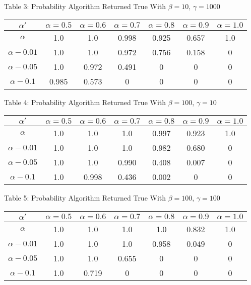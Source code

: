 \documentclass{article}
\begin{document}
\begin{center}
Table 3: Probability Algorithm Returned True With $\beta=10$, $\gamma=1000$ \\
\begin{tabular}{|c|c|c|c|c|c|c|}
\hline
$\alpha'$ & $\alpha = 0.5$ & $\alpha = 0.6$ & $\alpha = 0.7$ & $\alpha = 0.8$ & $\alpha = 0.9$ & $\alpha = 1.0$ \\
\hline
$\alpha$ & 1.0 & 1.0 & 0.998 & 0.925 & 0.657 & 1.0 \\
\hline
$\alpha-0.01$ & 1.0 & 1.0 & 0.972 & 0.756 & 0.158 & 0 \\
\hline
$\alpha-0.05$ & 1.0 & 0.972 & 0.491 & 0 & 0 & 0 \\
\hline
$\alpha-0.1$ & 0.985 & 0.573 & 0 & 0 & 0 & 0 \\
\hline
\end{tabular}
\end{center}

\begin{center}
Table 4: Probability Algorithm Returned True With $\beta=100$, $\gamma=10$ \\
\begin{tabular}{|c|c|c|c|c|c|c|}
\hline
$\alpha'$ & $\alpha = 0.5$ & $\alpha = 0.6$ & $\alpha = 0.7$ & $\alpha = 0.8$ & $\alpha = 0.9$ & $\alpha = 1.0$ \\
\hline
$\alpha$ & 1.0 & 1.0 & 1.0 & 0.997 & 0.923 & 1.0 \\
\hline
$\alpha-0.01$ & 1.0 & 1.0 & 1.0 & 0.982 & 0.680 & 0 \\
\hline
$\alpha-0.05$ & 1.0 & 1.0 & 0.990 & 0.408 & 0.007 & 0 \\
\hline
$\alpha-0.1$ & 1.0 & 0.998 & 0.436 & 0.002 & 0 & 0 \\
\hline
\end{tabular}
\end{center}

\begin{center}
Table 5: Probability Algorithm Returned True With $\beta=100$, $\gamma=100$ \\
\begin{tabular}{|c|c|c|c|c|c|c|}
\hline
$\alpha'$ & $\alpha = 0.5$ & $\alpha = 0.6$ & $\alpha = 0.7$ & $\alpha = 0.8$ & $\alpha = 0.9$ & $\alpha = 1.0$ \\
\hline
$\alpha$ & 1.0 & 1.0 & 1.0 & 1.0 & 0.832 & 1.0 \\
\hline
$\alpha-0.01$ & 1.0 & 1.0 & 1.0 & 0.958 & 0.049 & 0 \\
\hline
$\alpha-0.05$ & 1.0 & 1.0 & 0.655 & 0 & 0 & 0 \\
\hline
$\alpha-0.1$ & 1.0 & 0.719 & 0 & 0 & 0 & 0 \\
\hline
\end{tabular}
\end{center}
\end{document}

